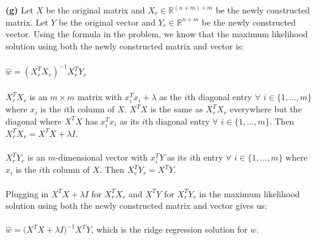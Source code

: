 \documentclass[submit]{harvardml}
\newcommand{\R}{\mathbb{R}}
\begin{document}
\textbf{(g)} Let $X$ be the original matrix and $X_{r}\in\R^{(n+m)\times m}$ be the newly constructed matrix. Let $Y$ be the original vector and $Y_r\in\R^{n+m}$ be the newly constructed vector. Using the formula in the problem, we know that the maximum likelihood solution using both the newly constructed matrix and vector is:\\\\
$\hat w=(X_r^TX_r)^{-1}X_r^TY_r$\\\\
$X_r^TX_r$ is an $m\times m$ matrix with $x_{i}^Tx_{i}+\lambda$ as the $i$th diagonal entry $\forall$ $i\in\{1,...,m\}$ where $x_{i}$ is the $i$th column of $X$. $X^TX$ is the same as $X_r^TX_r$ everywhere but the diagonal where $X^TX$ has $x_i^Tx_i$ as its $i$th diagonal entry $\forall$ $i\in\{1,...,m\}$. Then $X_r^TX_r=X^TX+\lambda I$.\\\\
$X_r^TY_r$ is an $m$-dimensional vector with $x_i^TY$ as its $i$th entry $\forall$ $i\in\{1,...,m\}$ where $x_i$ is the $i$th column of $X$. Then $X_r^TY_r=X^TY$.\\\\
Plugging in $X^TX+\lambda I$ for $X_r^TX_r$ and $X^TY$ for $X_r^TY_r$ in the maximum likelihood solution using both the newly constructed matrix and vector gives us:\\\\
$\hat w=\Big(X^TX+\lambda I\Big)^{-1}X^TY$, which is the ridge regression solution for $w$.
\end{document}
